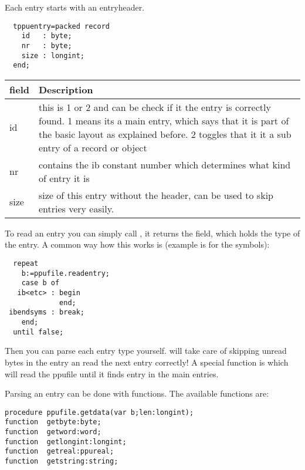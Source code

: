 \documentclass{report}
\begin{document}
Each entry starts with an entryheader.
\begin{verbatim}
  tppuentry=packed record                                                       
    id   : byte;                                                                
    nr   : byte;                                                                
    size : longint;                                                             
  end;      
\end{verbatim}

\begin{tabular}{lp{10cm}}
field & Description \\ \hline
id & this is 1 or 2 and can be check if it the entry is correctly
found. 1 means its a main entry, which says that it is part of the
basic layout as explained before. 2 toggles that it it a sub entry
of a record or object \\
nr & contains the ib constant number which determines what kind of
entry it is \\
size & size of this entry without the header, can be used to skip entries
very easily. \\ \hline
\end{tabular}

To read an entry you can simply call , 
it returns the
 field, which holds the type of the entry. 
A common way how this works is (example is for the symbols):

\begin{verbatim}
  repeat
    b:=ppufile.readentry;
    case b of
   ib<etc> : begin
             end;
 ibendsyms : break;
    end;
  until false;
\end{verbatim}

Then you can parse each entry type yourself.  will take
care of skipping unread bytes in the entry an read the next entry
correctly! A special function is 
which will read the ppufile until it finds entry  in the main
entries.

Parsing an entry can be done with  functions. The
available functions are:
\begin{verbatim}
procedure ppufile.getdata(var b;len:longint);
function  getbyte:byte;                                                     
function  getword:word;                                                     
function  getlongint:longint;                                               
function  getreal:ppureal;                                                  
function  getstring:string;      
\end{verbatim}
\end{document}
